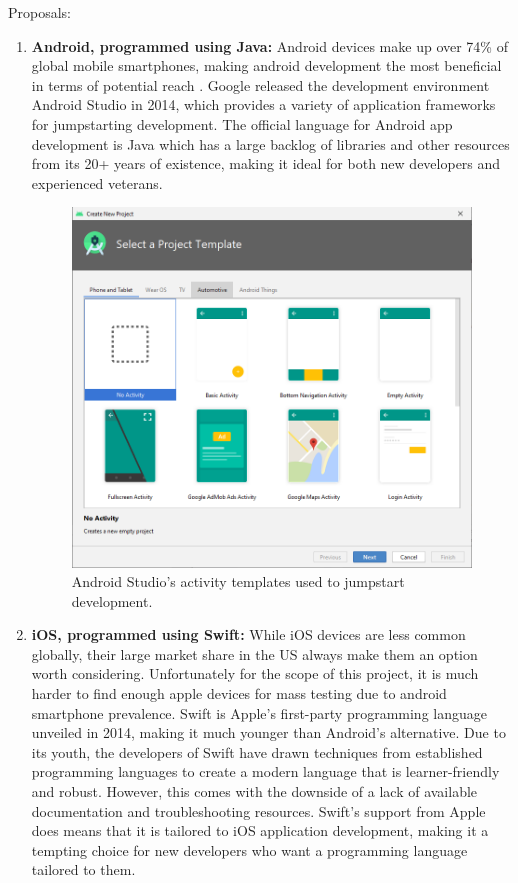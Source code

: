 Proposals:

\begin{enumerate}
    \item \textbf{Android, programmed using Java:} Android devices make up over 74\% of global mobile smartphones, making android development the most beneficial in terms of potential reach \cite{StatCounter}. Google released the development environment Android Studio in 2014, which provides a variety of application frameworks for jumpstarting development. The official language for Android app development is Java which has a large backlog of libraries and other resources from its 20+ years of existence, making it ideal for both new developers and experienced veterans. 
    \begin{figure}[H]
        \centering
        \includegraphics[width = .7\linewidth]{figures/AndroidStudioTemplates.PNG}
        \caption{Android Studio's activity templates used to jumpstart development.}
    \end{figure}
    \item \textbf{iOS, programmed using Swift:} While iOS devices are less common globally, their large market share in the US always make them an option worth considering. Unfortunately for the scope of this project, it is much harder to find enough apple devices for mass testing due to android smartphone prevalence. Swift is Apple's first-party programming language unveiled in 2014, making it much younger than Android's alternative. Due to its youth, the developers of Swift have drawn techniques from established programming languages to create a modern language that is learner-friendly and robust. However, this comes with the downside of a lack of available documentation and troubleshooting resources. Swift's support from Apple does means that it is tailored to iOS application development, making it a tempting choice for new developers who want a programming language tailored to them. 

\end{enumerate}
